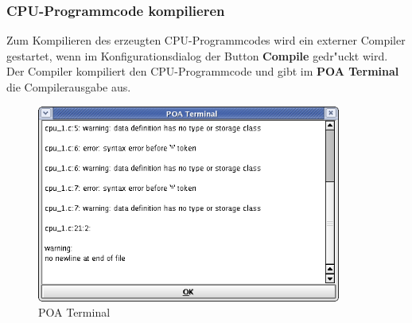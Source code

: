 \documentclass[a4paper,titlepage,12pt,ngerman]{scrbook}
\begin{document}
\newpage
\subsubsection{CPU-Programmcode kompilieren}
Zum Kompilieren des erzeugten CPU-Programmcodes wird ein externer Compiler gestartet, wenn im Konfigurationsdialog der Button {\bf Compile} gedr"uckt wird. Der Compiler kompiliert den CPU-Programmcode und gibt im {\bf POA Terminal} die Compilerausgabe aus.

\begin{figure}[htbp]

\begin{center}

\includegraphics[width=10cm]{Terminal}

\caption{POA Terminal}\label{test}

\end{center}

\end{figure}




\newpage
\end{document}
